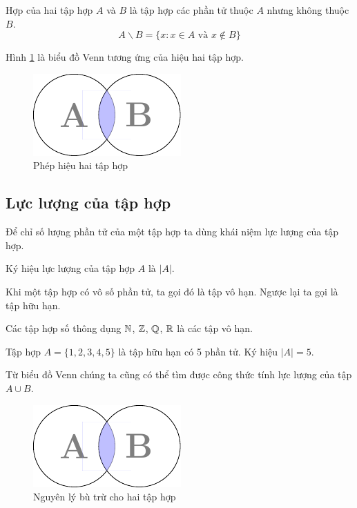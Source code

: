 \begin{definition}
    Hợp của hai tập hợp $A$ và $B$ là tập hợp các phần tử thuộc $A$ nhưng không thuộc $B$.
    \begin{equation}
        A \backslash B = \{ x : x \in A \text{ và } x \not\in B \}
    \end{equation}
\end{definition}

Hình \ref{set3} là biểu đồ Venn tương ứng của hiệu hai tập hợp.

\begin{figure}[ht]
    \centering
    \includegraphics[page=3]{figures/set/venn_diagram.pdf}
    \caption{Phép hiệu hai tập hợp}
    \label{set3}
\end{figure}

\subsection*{Lực lượng của tập hợp}

Để chỉ số lượng phần tử của một tập hợp ta dùng khái niệm lực lượng của tập hợp.

Ký hiệu lực lượng của tập hợp $A$ là $\lvert A \rvert$.

Khi một tập hợp có vô số phần tử, ta gọi đó là tập vô hạn. Ngược lại ta gọi là
tập hữu hạn.

\begin{example}
    Các tập hợp số thông dụng $\mathbb{N}$, $\mathbb{Z}$, $\mathbb{Q}$, $\mathbb{R}$ là các tập vô hạn.

    Tập hợp $A = \{ 1, 2, 3, 4, 5 \}$ là tập hữu hạn có 5 phần tử. Ký hiệu
    $\lvert A \rvert = 5$.
\end{example}

Từ biểu đồ Venn chúng ta cũng có thể tìm được công thức tính lực lượng của tập
$A \cup B$.

\begin{figure}[ht]
    \centering
    \includegraphics[page=4]{figures/set/venn_diagram.pdf}
    \caption{Nguyên lý bù trừ cho hai tập hợp}
    \label{set4}
\end{figure}

